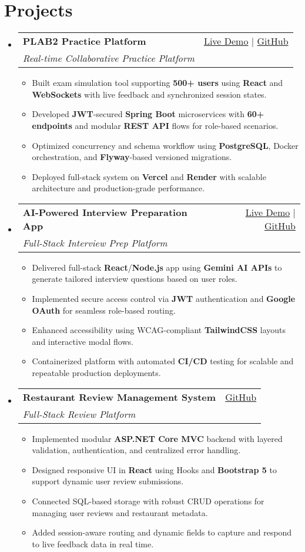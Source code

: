 \documentclass[letterpaper,11pt]{article}
\makeatletter
\newcommand{\resumeItem}[1]{\item\small{#1 \vspace{-2pt}}}
\newcommand{\resumeSubheading}[4]{
  \vspace{-1pt}\item
    \begin{tabular*}{0.97\textwidth}[t]{l@{\extracolsep{\fill}}r}
      \textbf{#1} & #2 \\
      \textit{\small#3} & \textit{\small #4} \\
    \end{tabular*}\vspace{-5pt}
}
\newcommand{\resumeSubHeadingListStart}{\begin{itemize}[leftmargin=*]}
\newcommand{\resumeSubHeadingListEnd}{\end{itemize}}
\newcommand{\resumeItemListStart}{\begin{itemize}}
\newcommand{\resumeItemListEnd}{\end{itemize}\vspace{-5pt}}
\makeatother
\begin{document}
\section{Projects}
  \resumeSubHeadingListStart
    \resumeSubheading
      {\textbf{PLAB2 Practice Platform}}{\href{https://plab2practice.com}{Live Demo} | \href{https://github.com/altansaid/plab2projectnew}{GitHub}}
      {Real-time Collaborative Practice Platform}{}
      \resumeItemListStart
        \resumeItem{Built exam simulation tool supporting \textbf{500+ users} using \textbf{React} and \textbf{WebSockets} with live feedback and synchronized session states.}
        \resumeItem{Developed \textbf{JWT}-secured \textbf{Spring Boot} microservices with \textbf{60+ endpoints} and modular \textbf{REST API} flows for role-based scenarios.}
        \resumeItem{Optimized concurrency and schema workflow using \textbf{PostgreSQL}, Docker orchestration, and \textbf{Flyway}-based versioned migrations.}
        \resumeItem{Deployed full-stack system on \textbf{Vercel} and \textbf{Render} with scalable architecture and production-grade performance.}
      \resumeItemListEnd

    \resumeSubheading
      {\textbf{AI-Powered Interview Preparation App}}{\href{https://interviewcoach-ai.vercel.app}{Live Demo} | \href{https://github.com/altansaid/interviewcoach-ai}{GitHub}}
      {Full-Stack Interview Prep Platform}{}
      \resumeItemListStart
        \resumeItem{Delivered full-stack \textbf{React}/\textbf{Node.js} app using \textbf{Gemini AI APIs} to generate tailored interview questions based on user roles.}
        \resumeItem{Implemented secure access control via \textbf{JWT} authentication and \textbf{Google OAuth} for seamless role-based routing.}
        \resumeItem{Enhanced accessibility using WCAG-compliant \textbf{TailwindCSS} layouts and interactive modal flows.}
        \resumeItem{Containerized platform with automated \textbf{CI/CD} testing for scalable and repeatable production deployments.}
      \resumeItemListEnd

    \resumeSubheading
      {\textbf{Restaurant Review Management System}}{\href{https://github.com/altansaid/restaurantreviewmanagementsystem}{GitHub}}{Full-Stack Review Platform}{}
      \resumeItemListStart
        \resumeItem{Implemented modular \textbf{ASP.NET Core MVC} backend with layered validation, authentication, and centralized error handling.}
        \resumeItem{Designed responsive UI in \textbf{React} using Hooks and \textbf{Bootstrap 5} to support dynamic user review submissions.}
        \resumeItem{Connected SQL-based storage with robust CRUD operations for managing user reviews and restaurant metadata.}
        \resumeItem{Added session-aware routing and dynamic fields to capture and respond to live feedback data in real time.}
      \resumeItemListEnd
  \resumeSubHeadingListEnd
\end{document}
